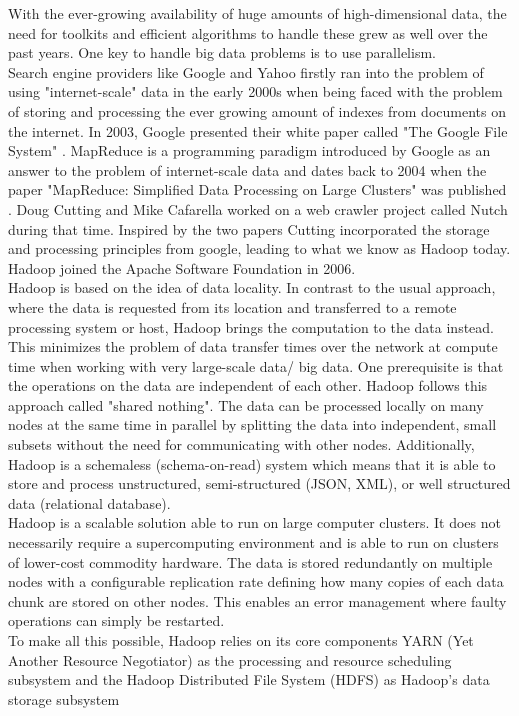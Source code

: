 With the ever-growing availability of huge amounts of high-dimensional data, the need for toolkits and efficient algorithms to handle these grew as well over the past years. One key to handle big data problems is to use parallelism.\\
Search engine providers like Google and Yahoo firstly ran into the problem of using "internet-scale" data in the early 2000s when being faced with the problem of storing and processing the ever growing amount of indexes from documents on the internet. In 2003, Google presented their white paper called "The Google File System" \cite{gfs}. MapReduce is a programming paradigm introduced by Google as an answer to the problem of internet-scale data and dates back to 2004 when the paper "MapReduce: Simplified Data Processing on Large Clusters" was published \cite{mapreduce1}. Doug Cutting and Mike Cafarella worked on a web crawler project called Nutch during that time. Inspired by the two papers Cutting incorporated the storage and processing principles from google, leading to what we know as Hadoop today. Hadoop joined the Apache Software Foundation in 2006. \cite[p. 6]{sparkbook1}\\ 
Hadoop is based on the idea of data locality. In contrast to the usual approach, where the data is requested from its location and transferred to a remote processing system or host, Hadoop brings the computation to the data instead. This minimizes the problem of data transfer times over the network at compute time when working with very large-scale data/ big data. One prerequisite is that the operations on the data are independent of each other. Hadoop follows this approach called "shared nothing". The data can be processed locally on many nodes at the same time in parallel by splitting the data into independent, small subsets without the need for communicating with other nodes. Additionally, Hadoop is a schemaless (schema-on-read) system which means that it is able to store and process unstructured, semi-structured (JSON, XML), or well structured data (relational database). \cite[p. 7]{sparkbook1}\\
Hadoop is a scalable solution able to run on large computer clusters. It does not necessarily require a supercomputing environment and is able to run on clusters of lower-cost commodity hardware. The data is stored redundantly on multiple nodes with a configurable replication rate defining how many copies of each data chunk are stored on other nodes. This enables an error management where faulty operations can simply be restarted.\\
To make all this possible, Hadoop relies on its core components YARN (Yet Another Resource Negotiator) as the processing and resource scheduling subsystem and the Hadoop Distributed File System (HDFS) as Hadoop's data storage subsystem\\

